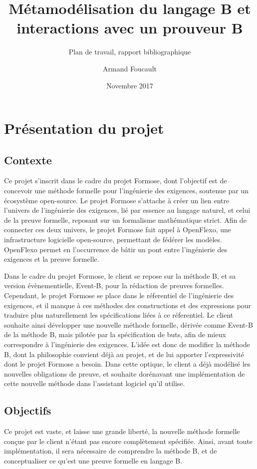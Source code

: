 \documentclass{article}
\author{Armand Foucault}
\date{Novembre 2017}
\title{Métamodélisation du langage B et \mbox{interactions} avec un prouveur B}
\subtitle{Plan de travail, rapport bibliographique}
\begin{document}
\imtaMaketitlepage

\tableofcontents

\newpage


\section{Présentation du projet}

\subsection{Contexte}

Ce projet s'inscrit dans le cadre du projet Formose, dont l'objectif est de concevoir une méthode formelle pour l'ingénierie %
des exigences, soutenue par un écosystème open-source.
Le projet Formose s'attache à créer un lien entre l'univers de l'ingénierie des exigences, lié par essence au langage naturel, %
et celui de la preuve formelle, reposant sur un formalisme mathématique strict.
Afin de connecter ces deux univers, le projet Formose fait appel à OpenFlexo, une infrastructure logicielle open-source, permettant de fédérer les modèles.
OpenFlexo permet en l'occurrence de bâtir un pont entre l'ingénierie des exigences et la preuve formelle.

Dans le cadre du projet Formose, le client se repose sur la méthode B, et sa version évènementielle, Event-B, pour la rédaction de preuves formelles.
Cependant, le projet Formose se place dans le réferentiel de l'ingénierie des exigences, et il manque à ces méthodes des constructions et des expressions %
pour traduire plus naturellement les spécifications liées à ce réferentiel.
Le client souhaite ainsi développer une nouvelle méthode formelle, dérivée comme Event-B de la méthode B, mais pilotée par la spécification de buts, afin de mieux correspondre %
à l'ingénierie des exigences.
L'idée est donc de modifier la méthode B, dont la philosophie convient déjà au projet, et de lui apporter l'expressivité dont le projet Formose a besoin.
Dans cette optique, le client a déjà modélisé les nouvelles obligations de preuve, et souhaite dorénavant une implémentation de cette nouvelle méthode dans l'assistant logiciel qu'il utilise.

\subsection{Objectifs}

Ce projet est vaste, et laisse une grande liberté, la nouvelle méthode formelle conçue par le client n'étant pas encore complètement spécifiée.
Ainsi, avant toute implémentation, il sera nécessaire de comprendre la méthode B, et de conceptualiser ce qu'est une preuve formelle en langage B.
\end{document}
